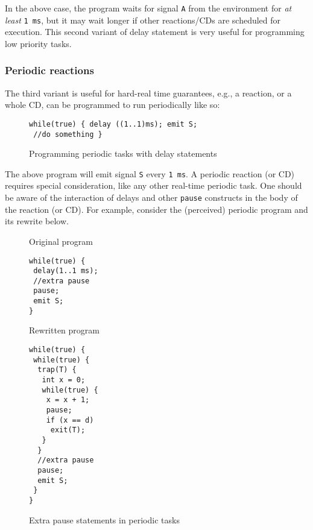 In the above case, the program waits for signal \texttt{A} from the
environment for \textit{at least} \texttt{1 ms}, but it may wait longer
if other reactions/CDs are scheduled for execution. This second variant
of delay statement is very useful for programming low priority tasks.

\subsubsection{Periodic reactions}
\label{sec:periodic-reactions}

The third variant is useful for hard-real time guarantees, e.g., a
reaction, or a whole CD, can be programmed to run periodically like so:

\begin{figure}[h!]
  \centering
  \begin{minipage}[b]{\linewidth}
\begin{verbatim}
while(true) { delay ((1..1)ms); emit S; 
 //do something }
\end{verbatim}
  \end{minipage}
  \caption{Programming periodic tasks with delay statements}
  \label{fig:periodic}
\end{figure}

The above program will emit signal \texttt{S} every \texttt{1 ms}. A
periodic reaction (or CD) requires special consideration, like any other
real-time periodic task. One should be aware of the interaction of
delays and other \texttt{pause} constructs in the body of the reaction
(or CD). For example, consider the (perceived) periodic program and its
rewrite below.

\begin{figure}[h!]
  \centering
  \begin{SubFloat}{\label{pp:a}Original program}
    \centering
    \begin{minipage}[b]{0.3\linewidth}
\begin{verbatim}
while(true) {
 delay(1..1 ms);
 //extra pause
 pause;
 emit S;
}
\end{verbatim}
  \end{minipage}
\end{SubFloat}
\hspace{9pt}
  \begin{SubFloat}{\label{pp:b}Rewritten program}
    \begin{minipage}[h]{0.5\linewidth}
\begin{verbatim}
while(true) {
 while(true) { 
  trap(T) {
   int x = 0;
   while(true) {
    x = x + 1;
    pause;
    if (x == d)
     exit(T);
   }
  }
  //extra pause
  pause;
  emit S;
 }
}
\end{verbatim}
    \end{minipage}
  \end{SubFloat}
\caption{Extra pause statements in periodic tasks}
  \label{fig:periodic2}
\end{figure}

